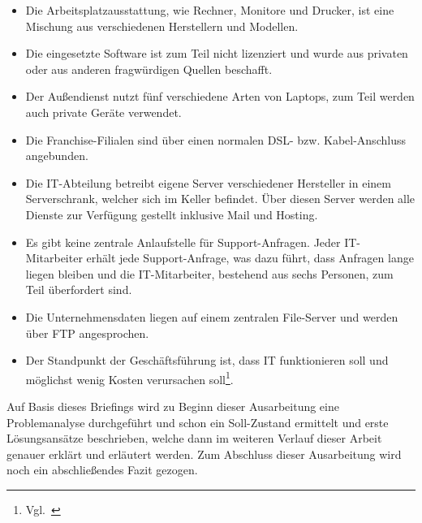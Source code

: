\begin{itemize}
\item Die Arbeitsplatzausstattung, wie Rechner, Monitore und Drucker,
  ist eine Mischung aus verschiedenen Herstellern und Modellen.
\item Die eingesetzte Software ist zum Teil nicht lizenziert und wurde
  aus privaten oder aus anderen fragwürdigen Quellen beschafft.
\item Der Außendienst nutzt fünf verschiedene Arten von Laptops, zum
  Teil werden auch private Geräte verwendet.
\item Die Franchise-Filialen sind über einen normalen DSL-
  bzw. Kabel-Anschluss angebunden.
\item Die IT-Abteilung betreibt eigene Server verschiedener Hersteller
  in einem Serverschrank, welcher sich im Keller befindet. Über diesen
  Server werden alle Dienste zur Verfügung gestellt inklusive Mail und
  Hosting.
\item Es gibt keine zentrale Anlaufstelle für Support-Anfragen. Jeder
  IT-Mitarbeiter erhält jede Support-Anfrage, was dazu führt, dass
  Anfragen lange liegen bleiben und die IT-Mitarbeiter, bestehend aus
  sechs Personen, zum Teil überfordert sind.
\item Die Unternehmensdaten liegen auf einem zentralen File-Server und
werden über \acrshort{FTP} angesprochen.
\item Der Standpunkt der Geschäftsführung ist, dass IT funktionieren
  soll und möglichst wenig Kosten verursachen
  soll\footnote{Vgl.~\cite{ITMS-Briefing}}.
\end{itemize}

Auf Basis dieses Briefings wird zu Beginn dieser Ausarbeitung eine
Problemanalyse durchgeführt und schon ein Soll-Zustand ermittelt und
erste Lösungsansätze beschrieben, welche dann im weiteren Verlauf
dieser Arbeit genauer erklärt und erläutert werden. Zum Abschluss
dieser Ausarbeitung wird noch ein abschließendes Fazit gezogen.
